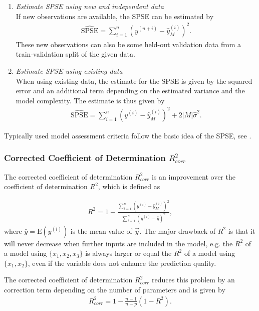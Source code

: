 \begin{enumerate}

	\item \emph{Estimate SPSE using new and independent data} \\	
	If new observations are available, the SPSE can be estimated by
	\begin{align}
		\widehat{\text{SPSE}} = \sum_{i=1}^n (y^{(n+i)} - \hat y^{(i)}_M)^2.
	\end{align}
	These new observations can also be some held-out validation data from a train-validation split of the given data. 
	
	\item \emph{Estimate SPSE using existing data} \\
	When using existing data, the estimate for the SPSE is given by the squared error and an additional  term depending on the estimated variance and the model complexity. The estimate is thus given by
	\begin{align}
		\widehat{\text{SPSE}} = \sum_{i=1}^n(y^{(i)} - \hat y^{(i)}_M)^2 + 2\vert M \vert \hat \sigma^2.
	\end{align}

\end{enumerate}

Typically used model assessment criteria follow the basic idea of the SPSE, see \cite{fahrmeir2007regression}.

\subsubsection{Corrected Coefficient of Determination $R_{corr}^2$}

The corrected coefficient of determination $R^2_{corr}$ is an improvement over the coefficient of determination $R^2$, which is defined as 

\begin{align}
	R^2 = 1 - \frac{\sum_{i=1}^n ( y^{(i)} - \hat y^{(i)}_M )^2}{\sum_{i=1}^n (y^{(i)} - \bar y)^2},
\end{align}
%
where $\bar y = \text{E}(y^{(i)})$ is the mean value of $\vec{y}$. The major drawback of $R^2$ is that it will never decrease when further inputs are included in the model, e.g. the $R^2$ of a model using $\{x_1, x_2, x_3\}$ is always larger or equal the $R^2$ of a model using $\{x_1, x_2\}$, even if the variable does not enhance the prediction quality. 

The corrected coefficient of determination $R_{corr}^2$ reduces this problem by an correction term depending on the  number of parameters and is given by
\begin{align}
	R_{corr}^2 = 1 - \frac{n-1}{n-p}(1-R^2).
\end{align}

